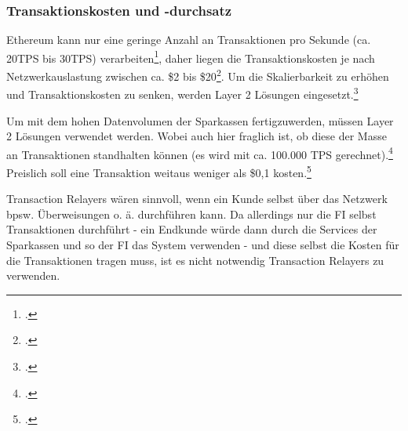 \subsubsection{Transaktionskosten und -durchsatz}
Ethereum kann nur eine geringe Anzahl an Transaktionen pro Sekunde (ca. 20TPS bis 30TPS)  verarbeiten\footcite[Vgl.][]{w36}, daher liegen die Transaktionskosten je nach Netzwerkauslastung zwischen ca. \$2 bis \$20\footcite[Vgl.][]{w35}.
Um die Skalierbarkeit zu erhöhen und Transaktionskosten zu senken, werden Layer 2 Lösungen eingesetzt.\footcite[Vgl.][]{w17}



\bigbreak
\noindent
Um mit dem hohen Datenvolumen der Sparkassen fertigzuwerden, müssen Layer 2 Lösungen verwendet werden. 
Wobei auch hier fraglich ist, ob diese der Masse an Transaktionen standhalten können (es wird mit ca. 100.000 TPS gerechnet).\footcite[Vgl.][]{w34}
Preislich soll eine Transaktion weitaus weniger als \$0,1 kosten.\footcite[Vgl.][]{w37}




\bigbreak
\noindent
Transaction Relayers wären sinnvoll, wenn ein Kunde selbst über das Netzwerk bpsw. Überweisungen o. ä. durchführen kann.
Da allerdings nur die FI selbst Transaktionen durchführt - ein Endkunde würde dann durch die Services der Sparkassen und so der FI das System verwenden - und diese selbst die Kosten für die Transaktionen tragen muss, ist es nicht notwendig Transaction Relayers zu verwenden.